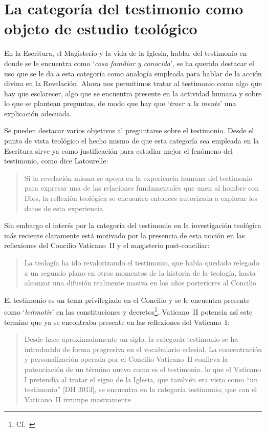 \section{La categoría del testimonio como objeto de estudio teológico}

En la Escritura, el Magisterio y la vida de la Iglesia, hablar del testimonio en donde se le encuentra como \enquote*{\emph{cosa familiar y conocida}}, se ha querido destacar el uso que se le da a esta categoría como analogía empleada para hablar de la acción divina en la Revelación. Ahora nos permitimos tratar al testimonio como algo que hay que esclarecer, algo que se encuentra presente en la actividad humana y sobre lo que se plantean preguntas, de modo que hay que \enquote*{\emph{traer a la mente}} una explicación adecuada.

Se pueden destacar varios objetivos al preguntarse sobre el testimonio. Desde el punto de vista teológico el hecho mismo de que esta categoría sea empleada en la Escritura sirve ya como justificación para estudiar mejor el fenómeno del testimonio, como dice Latourelle: \blockquote[{\cite[1523]{latourelle2000testimonio}}]{Si la revelación misma se apoya en la experiencia humana del testimonio para expresar una de las relaciones fundamentales que unen al hombre con Dios, la reflexión teológica se encuentra entonces autorizada a explorar los datos de esta experiencia}. Sin embargo el interés por la categoría del testimonio en la investigación teológica más reciente claramente está motivado por la presencia de esta noción en las reflexiones del Concilio Vaticano~II y el magisterio post-conciliar: \blockquote[{\cite[81]{prades2015testimonio}}]{La teología ha ido revalorizando el testimonio, que había quedado relegado a un segundo plano en otros momentos de la historia de la teología, hasta alcanzar una difusión realmente masiva en los años posteriores al Concilio}. El testimonio es un tema privilegiado en el Concilio y se le encuentra presente como `\emph{leitmotiv}' en las constituciones y decretos\footnote{Cf.~\cite[1523]{latourelle2000testimonio}}. Vaticano~II potencia así este termino que ya se encontraba presente en las reflexiones del Vaticano~I: \blockquote[{\cite[572]{ninot2009tf}}]{Desde hace aproximadamente un siglo, la categoría testimonio se ha introducido de forma progresiva en el vocabulario eclesial. La concentración y personalización operada por el Concilio Vaticano~II conlleva la potenciación de un término nuevo como es el testimonio. \textelp{} lo que el Vaticano I pretendía al tratar el signo de la Iglesia, que también era visto como ``un testimonio'' [DH 3013], se encuentra en la categoría testimonio, que con el Vaticano~II irrumpe masivamente}.

